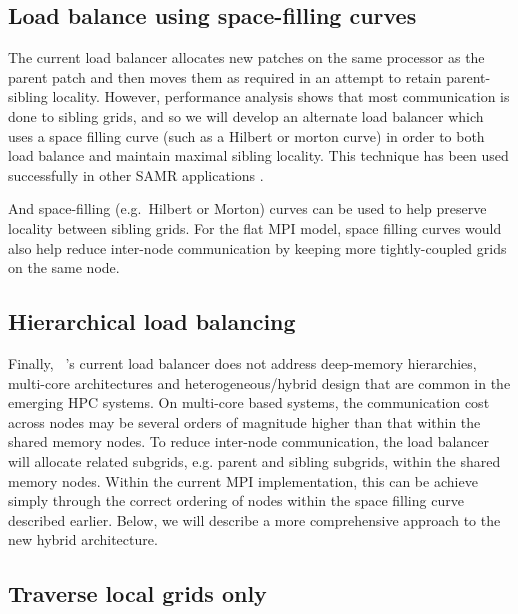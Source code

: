 \documentclass{article}
\begin{document}
\subsection{Load balance using space-filling curves}  \label{solution:amr-balance-hilbert}

The current load balancer allocates new patches on the same
processor as the parent patch and then moves them as required in an
attempt to retain parent-sibling locality.  However, performance
analysis shows that most communication is done to sibling grids, and
so we will develop an alternate load balancer which uses a space
filling curve (such as a Hilbert or morton curve) in order to both
load balance and maintain maximal sibling locality.  This technique
has been used successfully in other SAMR applications
\cite{WHH03,LWBH07}.

And space-filling (e.g.~Hilbert or Morton) curves can be used to help
preserve locality between sibling grids.  For the flat MPI model,
space filling curves would also help reduce inter-node communication
by keeping more tightly-coupled grids on the same node.

\subsection{Hierarchical load balancing}\label{solution:amr-balance-hierarchical}

Finally, \enzo\ 's current load balancer does not address deep-memory
hierarchies, multi-core architectures and heterogeneous/hybrid design
that are common in the emerging HPC systems. On multi-core based
systems, the communication cost across nodes may be several orders of
magnitude higher than that within the shared memory nodes. To reduce
inter-node communication, the load balancer will allocate related
subgrids, e.g. parent and sibling subgrids, within the shared memory
nodes.  Within the current MPI implementation, this can be achieve
simply through the correct ordering of nodes within the space filling
curve described earlier.  Below, we will describe a more comprehensive
approach to the new hybrid architecture.

\subsection{Traverse local grids only}\label{solution:amr-traversal-local}
\end{document}
